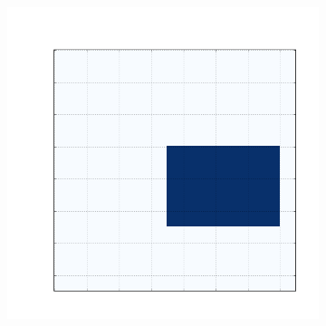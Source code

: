 \documentclass[10pt]{beamer}
\begin{document}
\begin{frame}
\begin{figure}[H]
\begin{subfigure}[b]{0.13\textwidth}
      \end{subfigure}
      \begin{subfigure}[b]{0.13\textwidth}
          \includegraphics[width=\textwidth]{img/a-reconstruction-binovnmtf.png}
      \end{subfigure}


\end{figure}
\end{frame}
\end{document}
